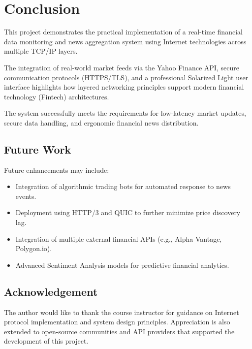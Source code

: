 \chapter{Conclusion}

This project demonstrates the practical implementation of a real-time financial data monitoring and news aggregation system using Internet technologies across multiple TCP/IP layers. 

The integration of real-world market feeds via the Yahoo Finance API, secure communication protocols (HTTPS/TLS), and a professional Solarized Light user interface highlights how layered networking principles support modern financial technology (Fintech) architectures.

The system successfully meets the requirements for low-latency market updates, secure data handling, and ergonomic financial news distribution.

\section{Future Work}

Future enhancements may include:

\begin{itemize}
    \item Integration of algorithmic trading bots for automated response to news events.
    \item Deployment using HTTP/3 and QUIC to further minimize price discovery lag.
    \item Integration of multiple external financial APIs (e.g., Alpha Vantage, Polygon.io).
    \item Advanced Sentiment Analysis models for predictive financial analytics.
\end{itemize}

\section{Acknowledgement}

The author would like to thank the course instructor for guidance on Internet protocol implementation and system design principles. Appreciation is also extended to open-source communities and API providers that supported the development of this project.
